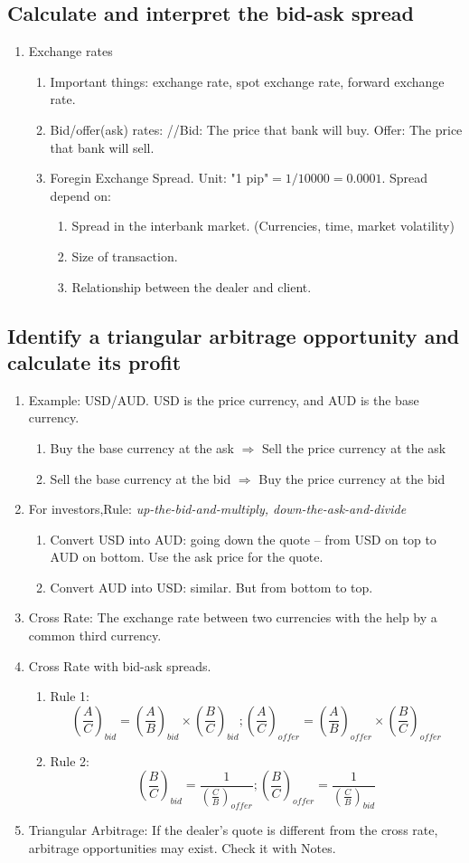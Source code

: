 \documentclass{article}
\newcommand{\be}{\begin{enumerate}}
\newcommand{\ee}{\end{enumerate}}
\begin{document}
\subsection{Calculate and interpret the bid-ask spread}
\be
    \item Exchange rates
        \be
            \item Important things: exchange rate, spot exchange rate, forward exchange rate.
            \item Bid/offer(ask) rates:
                //Bid: The price that bank will buy. Offer: The price that bank will sell.
            \item Foregin Exchange Spread. Unit: "1 pip"$=1/10000=0.0001$. Spread depend on:
                \be
                    \item Spread in the interbank market. (Currencies, time, market volatility)
                    \item Size of transaction.
                    \item Relationship between the dealer and client.
                \ee
        \ee
\ee
\subsection{Identify a triangular arbitrage opportunity and calculate its profit}
\be
    \item Example: USD/AUD. USD is the price currency, and AUD is the base currency.
        \be
            \item Buy the base currency at the ask $\Rightarrow$ Sell the price currency at the ask
            \item Sell the base currency at the bid $\Rightarrow$ Buy the price currency at the bid
        \ee
    \item For investors,Rule: {\it up-the-bid-and-multiply, down-the-ask-and-divide}
        \be
            \item Convert USD into AUD: going down the quote -- from USD on top 
                to AUD on bottom. Use the ask price for the quote.
            \item Convert AUD into USD: similar. But from bottom to top.
        \ee
    \item Cross Rate: The exchange rate between two currencies with the help by 
        a common third currency.
    \item Cross Rate with bid-ask spreads.
        \be
            \item Rule 1:
            $$
            \left(\frac{A}{C}\right)_{bid}=\left(\frac{A}{B}\right)_{bid}
            \times \left(\frac{B}{C}\right)_{bid};
            \left(\frac{A}{C}\right)_{offer}=\left(\frac{A}{B}\right)_{offer}
            \times \left(\frac{B}{C}\right)_{offer}
            $$
            \item Rule 2:
            $$
            \left(\frac{B}{C}\right)_{bid}=\frac{1}{\left(\frac{C}{B}\right)_{offer}};
            \left(\frac{B}{C}\right)_{offer}=\frac{1}{\left(\frac{C}{B}\right)_{bid}}
            $$
        \ee
    \item Triangular Arbitrage: If the dealer's quote is different from the cross
        rate, arbitrage opportunities may exist. Check it with Notes.
\ee
\end{document}
